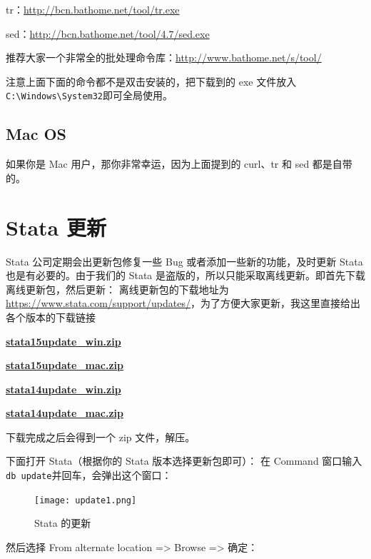 \documentclass[cn,fancy,blue,11pt]{elegantbook}
\begin{document}
tr：\url{http://bcn.bathome.net/tool/tr.exe}

sed：\url{http://bcn.bathome.net/tool/4.7/sed.exe}

推荐大家一个非常全的批处理命令库：\url{http://www.bathome.net/s/tool/}

注意上面下面的命令都不是双击安装的，把下载到的 exe 文件放入\lstinline{C:\Windows\System32}即可全局使用。

\hypertarget{mac-os-3}{%
\subsection{Mac OS}\label{mac-os-3}}

如果你是 Mac 用户，那你非常幸运，因为上面提到的 curl、tr 和 sed 都是自带的。

\hypertarget{stata--2}{%
\section{Stata 更新}\label{stata--2}}

Stata 公司定期会出更新包修复一些 Bug 或者添加一些新的功能，及时更新 Stata 也是有必要的。由于我们的 Stata 是盗版的，所以只能采取离线更新。即首先下载离线更新包，然后更新：
离线更新包的下载地址为\url{https://www.stata.com/support/updates/}，为了方便大家更新，我这里直接给出各个版本的下载链接

\textbf{\href{https://www.stata.com/support/updates/stata15/stata15update_win.zip}{stata15update\_win.zip}}

\textbf{\href{https://www.stata.com/support/updates/stata15/stata15update_mac.zip}{stata15update\_mac.zip}}

\textbf{\href{https://www.stata.com/support/updates/stata14/stata14update_win.zip}{stata14update\_win.zip}}

\textbf{\href{https://www.stata.com/support/updates/stata14/stata14update_mac.zip}{stata14update\_mac.zip}}

下载完成之后会得到一个 zip 文件，解压。

下面打开 Stata（根据你的 Stata 版本选择更新包即可）：
在 Command 窗口输入\lstinline{db update}并回车，会弹出这个窗口：

\begin{figure}[htbp]
  \centering
  \texttt{[image: update1.png]}
  \caption{Stata 的更新}
  \label{fig:update1}
\end{figure}

然后选择 From alternate location =\textgreater{} Browse =\textgreater{} 确定：
\end{document}
